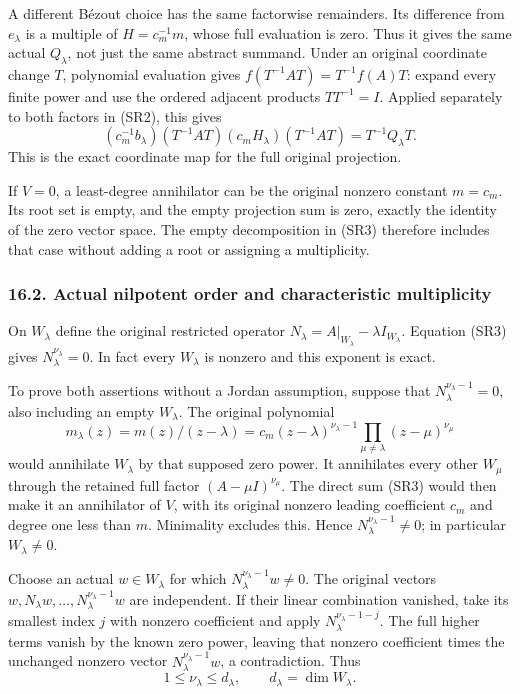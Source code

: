 \documentclass[
  11pt,
]{article}
\begin{document}
A different Bézout choice has the same factorwise remainders. Its
difference from \(e_\lambda\) is a multiple of \(H=c_m^{-1}m\), whose
full evaluation is zero. Thus it gives the same actual \(Q_\lambda\),
not just the same abstract summand. Under an original coordinate change
\(T\), polynomial evaluation gives \(f(T^{-1}AT)=T^{-1}f(A)T\): expand
every finite power and use the ordered adjacent products \(TT^{-1}=I\).
Applied separately to both factors in (SR2), this gives \[
 (c_m^{-1}b_\lambda)(T^{-1}AT)
 (c_mH_\lambda)(T^{-1}AT)=T^{-1}Q_\lambda T.                  \tag{SR4}
\] This is the exact coordinate map for the full original projection.

If \(V=0\), a least-degree annihilator can be the original nonzero
constant \(m=c_m\). Its root set is empty, and the empty projection sum
is zero, exactly the identity of the zero vector space. The empty
decomposition in (SR3) therefore includes that case without adding a
root or assigning a multiplicity.

\subsubsection{16.2. Actual nilpotent order and characteristic
multiplicity}\label{actual-nilpotent-order-and-characteristic-multiplicity}

On \(W_\lambda\) define the original restricted operator
\(N_\lambda=A|_{W_\lambda}-\lambda I_{W_\lambda}\). Equation (SR3) gives
\(N_\lambda^{\nu_\lambda}=0\). In fact every \(W_\lambda\) is nonzero
and this exponent is exact.

To prove both assertions without a Jordan assumption, suppose that
\(N_\lambda^{\nu_\lambda-1}=0\), also including an empty \(W_\lambda\).
The original polynomial \[
 m_\lambda(z)=m(z)/(z-\lambda)
       =c_m(z-\lambda)^{\nu_\lambda-1}
                    \prod_{\mu\ne\lambda}(z-\mu)^{\nu_\mu}
                                                               \tag{SR5}
\] would annihilate \(W_\lambda\) by that supposed zero power. It
annihilates every other \(W_\mu\) through the retained full factor
\((A-\mu I)^{\nu_\mu}\). The direct sum (SR3) would then make it an
annihilator of \(V\), with its original nonzero leading coefficient
\(c_m\) and degree one less than \(m\). Minimality excludes this. Hence
\(N_\lambda^{\nu_\lambda-1}\ne0\); in particular \(W_\lambda\ne0\).

Choose an actual \(w\in W_\lambda\) for which
\(N_\lambda^{\nu_\lambda-1}w\ne0\). The original vectors
\(w,N_\lambda w,\ldots,N_\lambda^{\nu_\lambda-1}w\) are independent. If
their linear combination vanished, take its smallest index \(j\) with
nonzero coefficient and apply \(N_\lambda^{\nu_\lambda-1-j}\). The full
higher terms vanish by the known zero power, leaving that nonzero
coefficient times the unchanged nonzero vector
\(N_\lambda^{\nu_\lambda-1}w\), a contradiction. Thus \[
             1\leq\nu_\lambda\leq d_\lambda,
                 \qquad d_\lambda=\dim W_\lambda.             \tag{SR6}
\]
\end{document}
